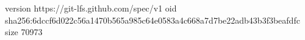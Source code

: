 version https://git-lfs.github.com/spec/v1
oid sha256:6dccf6d022c56a1470b565a985c64e0583a4c668a7d7be22adb43b3f3beafdfc
size 70973

